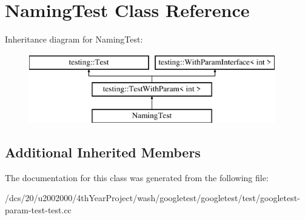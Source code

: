 \hypertarget{classNamingTest}{}\section{Naming\+Test Class Reference}
\label{classNamingTest}
Inheritance diagram for Naming\+Test\+:\begin{figure}[H]
\begin{center}
\leavevmode
\includegraphics[height=3.000000cm]{classNamingTest}
\end{center}
\end{figure}
\subsection*{Additional Inherited Members}


The documentation for this class was generated from the following file\+:\begin{DoxyCompactItemize}
\item 
/dcs/20/u2002000/4th\+Year\+Project/wash/googletest/googletest/test/googletest-\/param-\/test-\/test.\+cc\end{DoxyCompactItemize}
